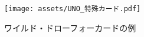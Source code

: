 \documentclass[11pt]{ltjsarticle}
\begin{document}
\begin{figure}[h]
  \begin{center}
    \texttt{[image: assets/UNO\_特殊カード.pdf]}
    \caption{ワイルド・ドローフォーカードの例}
    \label{fig:ワイルド・ドローフォーカードの例}
  \end{center}
\end{figure}
\end{document}
